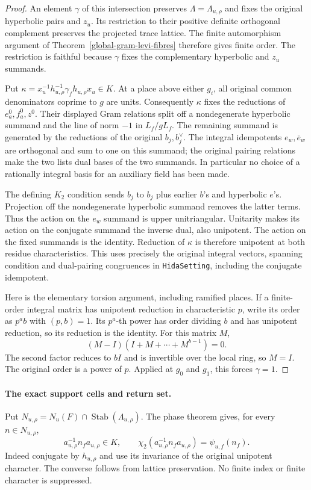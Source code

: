 \begin{proof}
An element $\gamma$ of this intersection preserves
$\Lambda=\Lambda_{u,\rho}$ and fixes the original hyperbolic pairs
and $z_u$.  Its restriction to their positive definite orthogonal
complement preserves the projected trace lattice.  The finite
automorphism argument of Theorem~\ref{global-gram-levi-fibres}
therefore gives finite order.  The restriction is faithful because
$\gamma$ fixes the complementary hyperbolic and $z_u$ summands.

Put $\kappa=x_u^{-1}h_{u,\rho}^{-1}\gamma_fh_{u,\rho}x_u\in K$.
At a place above either $g_i$, all original common denominators
coprime to $g$ are units.  Consequently $\kappa$ fixes the reductions
of $e^0_a,f^0_a,z^0$.  Their displayed Gram relations split off a
nondegenerate hyperbolic summand and the line of norm $-1$ in
$L_f/gL_f$.  The remaining summand is generated by the reductions
of the original $b_j,b_j^{\vee}$.  The integral idempotents
$e_w,\overline e_w$ are orthogonal and sum to one on this summand;
the original pairing relations make the two lists dual bases of
the two summands.  In particular no choice of a rationally integral
basis for an auxiliary field has been made.

The defining $K_2$ condition sends $b_j$ to $b_j$ plus earlier
$b$'s and hyperbolic $e$'s.  Projection off the nondegenerate
hyperbolic summand removes the latter terms.  Thus the action on
the $e_w$ summand is upper unitriangular.  Unitarity makes its
action on the conjugate summand the inverse dual, also unipotent.
The action on the fixed summands is the identity.  Reduction of
$\kappa$ is therefore unipotent at both residue characteristics.
This uses precisely the original integral vectors, spanning
condition and dual-pairing congruences in
\texttt{HidaSetting}, including the conjugate idempotent.
\cite{global-gram-period-source}

Here is the elementary torsion argument, including ramified places.
If a finite-order integral matrix has unipotent reduction in
characteristic $p$, write its order as $p^ab$ with $(p,b)=1$.
Its $p^a$-th power has order dividing $b$ and has unipotent
reduction, so its reduction is the identity.  For this matrix $M$,
\[
 (M-I)(I+M+\cdots+M^{b-1})=0.
\]
The second factor reduces to $bI$ and is invertible over the local
ring, so $M=I$.  The original order is a power of $p$.
Applied at $g_0$ and $g_1$, this forces $\gamma=1$.
\end{proof}

\paragraph{The exact support cells and return set.}
Put $N_{u,\rho}=N_u(F)\cap\operatorname{Stab}(\Lambda_{u,\rho})$.
The phase theorem gives, for every $n\in N_{u,\rho}$,
\begin{equation}\label{global-gram-column-unipotent}
 a_{u,\rho}^{-1}n_fa_{u,\rho}\in K,
 \qquad
 \chi_2(a_{u,\rho}^{-1}n_fa_{u,\rho})=\psi_{u,f}(n_f).
\end{equation}
Indeed conjugate by $h_{u,\rho}$ and use its invariance of the
original unipotent character.  The converse follows from lattice
preservation.  No finite index or finite character is suppressed.

